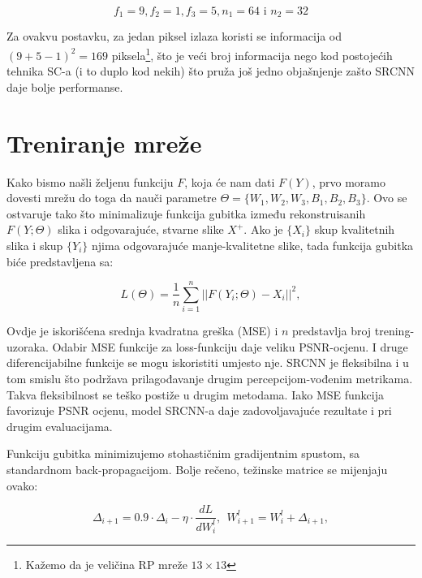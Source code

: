 \documentclass[12pt]{report}
\numberwithin{equation}{section}
\begin{document}
\begin{equation}
  f_1 = 9, f_2 = 1, f_3 = 5, n_1 = 64 \text{ i } n_2 = 32
\end{equation}


 Za ovakvu postavku, za jedan piksel izlaza koristi se informacija  od $(9 + 5 - 1)^2 = 169$ piksela\footnote{Kažemo da je veličina RP mreže $13 \times 13$}, što je veći broj informacija nego kod postojećih tehnika SC-a  (i to duplo kod nekih) što pruža još jedno objašnjenje zašto SRCNN daje bolje performanse.  

\section{Treniranje mreže}\label{ch2}


Kako bismo našli željenu funkciju $F$, koja će nam dati $F(Y)$, prvo moramo dovesti mrežu do toga da nauči parametre $\Theta = \{W_1 , W_2 , W_3 , B_1 , B_2 , B_3\}$. Ovo se ostvaruje tako što minimalizuje funkcija gubitka između rekonstruisanih $F(Y; \Theta)$ slika i odgovarajuće, stvarne slike $X^{+}$. Ako je $\{X_i\}$ skup kvalitetnih slika i skup $\{Y_i\}$ njima odgovarajuće manje-kvalitetne slike, tada funkcija gubitka biće predstavljena sa:  

\begin{equation}
  L(\Theta) = \frac{1}{n} \sum\limits_{i=1}^{n}{||F(Y_i; \Theta) - X_i ||}^2 ,
\end{equation}

Ovdje je iskorišćena srednja kvadratna greška (MSE) i $n$ predstavlja broj trening-uzoraka. Odabir MSE funkcije za loss-funkciju daje veliku PSNR-ocjenu. I druge diferencijabilne funkcije se mogu iskoristiti umjesto nje. SRCNN je fleksibilna i u tom smislu što podržava prilagođavanje drugim percepcijom-vođenim metrikama. Takva fleksibilnost se teško postiže u drugim metodama. Iako MSE funkcija favorizuje PSNR ocjenu, model SRCNN-a daje zadovoljavajuće rezultate i pri drugim evaluacijama.

Funkciju gubitka minimizujemo stohastičnim gradijentnim spustom, sa standardnom back-propagacijom. Bolje rečeno, težinske matrice se mijenjaju ovako: 

\begin{equation}
  \Delta_{i+1} = 0.9 \cdot \Delta_i - \eta \cdot \frac{dL}{dW_{i}^{l}}, \ \ W_{i+1}^{l}=W_{i}^{l}+\Delta_{i+1},
\end{equation}
 

\end{document}

